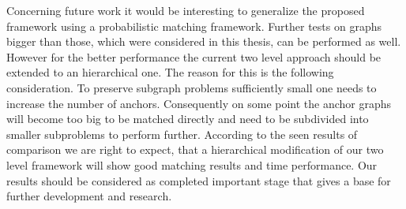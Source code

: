Concerning future work it would be interesting to generalize the proposed framework using a probabilistic matching framework. Further tests on graphs bigger than those, which were considered in this thesis, can be performed as well. However for the better performance the current two level approach should be extended to an hierarchical one. The reason for this is the following consideration. To preserve subgraph problems sufficiently small one needs to increase the number of anchors. Consequently on some point the anchor graphs will become too big to be matched directly and need to be subdivided into smaller subproblems to perform further. According to the seen results of comparison we are right to expect, that a hierarchical modification of our two level framework will show good matching results and time performance. 
Our results should be considered as completed important stage that gives a base for further development and research.

 
